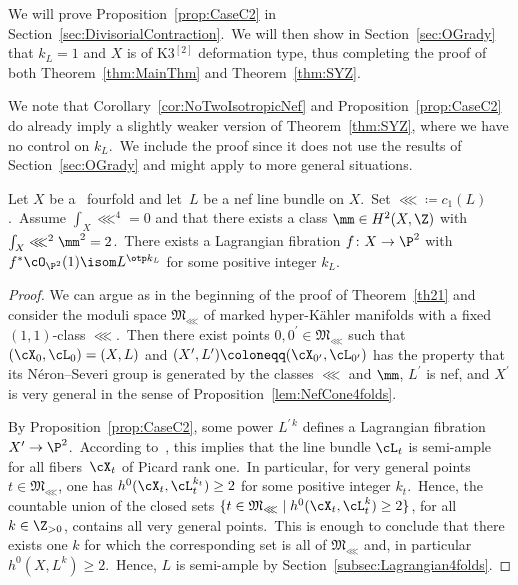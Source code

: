 We will prove Proposition~\ref{prop:CaseC2} in Section~\ref{sec:DivisorialContraction}.\
We will then show in Section~\ref{sec:OGrady} that   $k_L=1$ and $X$ is of  K3$^{[2]}$ deformation type, thus completing the proof of both Theorem~\ref{thm:MainThm} and Theorem~\ref{thm:SYZ}.

We note that Corollary~\ref{cor:NoTwoIsotropicNef} and Proposition~\ref{prop:CaseC2} do already imply a slightly weaker version of Theorem~\ref{thm:SYZ}, where we have no control on $k_L$.\
We include the proof since it does not use the results of Section~\ref{sec:OGrady} and  might apply to more general situations.



\begin{coro}[\HK\ SYZ conjecture]\label{cor:SYZ}
Let $X$ be a  \hk\ fourfold and let~$L$ be a nef line bundle on $X$.\ Set $\lll\coloneqq c_1(L)$.\ Assume   $\int_X \lll^4=0$ and that there exists a class $\mm\in H^2(X,{\Z})$ with $\int_X\lll^2\mm^2=2$.\
There exists a Lagrangian fibration $f\colon X\to\P^2$ with $f^*{\cO_{\P^2}}(1)\isom L^{\otp k_L}$ for some positive integer $k_L$.
\end{coro}

\begin{proof}
We can argue as in the beginning of the proof of Theorem~\ref{th21} and consider the moduli space ${\mathfrak M}_\lll$ of marked hyper-K\"ahler manifolds with a fixed $(1,1)$-class $\lll$.\
Then there exist  points $0,0^\prime\in {\mathfrak M}_\lll$ such that $(\cX_0,\cL_0)=(X,L)$ and $(X^\prime,L^\prime)\coloneqq (\cX_{0^\prime},\cL_{0^\prime})$ has the property that its N\'eron--Severi group is generated by the classes $\lll$ and $\mm$, $L^\prime$ is nef, and $X^\prime$ is very general in the sense of Proposition~\ref{lem:NefCone4folds}.

By Proposition~\ref{prop:CaseC2}, some power $L^{\prime\,k}$ defines a Lagrangian fibration $X^\prime\to\P^2$.\
According to~\cite[Lemma 2.4]{matlag}, this implies that the line bundle $\cL_t$ is semi-ample for all fibers~$\cX_t$ of Picard rank one.\
In particular, for   very general points $t\in{\mathfrak M}_\lll$, one has $h^0(\cX_t,\cL_t^{k_t})\geq2$ for some positive integer $k_t$.\
Hence, the  countable union  of the  closed sets $\{t\in{\mathfrak M}_\lll\mid h^0(\cX_t,\cL_t^{k})\geq2\}$, for all $k\in\Z_{>0}$,  contains all very general points.\
This is enough to conclude that there exists one $k$ for which the corresponding set is all of ${\mathfrak M}_\lll$ and, in particular $h^0(X,L^k)\geq2$.\
Hence, $L$ is semi-ample by Section~\ref{subsec:Lagrangian4folds}.
\end{proof}


